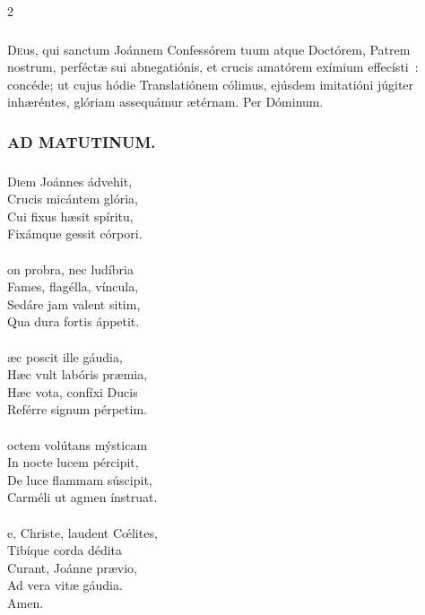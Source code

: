 \documentclass[9pt,twoside]{extarticle}
\begin{document}
\begin{multicols}{2}
\subsubsection*{\center {}}
\lettrine{D}eus, qui sanctum Joánnem Confessórem tuum atque Doctórem, Patrem nostrum, perféctæ sui abnegatiónis, et crucis amatórem exímium effecísti~: concéde; ut cujus hódie Translatiónem cólimus, ejúsdem imitatióni júgiter inhæréntes, glóriam assequámur ætérnam. Per Dóminum.

\subsubsection*{\center \textsc{AD MATUTINUM.}}
\subsubsection*{\center {}}
\lettrine{D}iem Joánnes ádvehit,\\
Crucis micántem glória,\\
Cui fixus hæsit spíritu,\\
Fixámque gessit córpori.\\
\\
on probra, nec ludíbria\\
Fames, flagélla, víncula,\\
Sedáre jam valent sitim,\\
Qua dura fortis áppetit.\\
\\
æc poscit ille gáudia,\\
Hæc vult labóris præmia,\\
Hæc vota, confíxi Ducis\\
Reférre signum pérpetim.\\
\\
octem volútans mýsticam\\
In nocte lucem pércipit,\\
De luce flammam súscipit,\\
Carméli ut agmen ínstruat.\\
\\
e, Christe, laudent Cœ́lites,\\
Tibíque corda dédita\\
Curant, Joánne prævio,\\
Ad vera vitæ gáudia.\\
Amen.

\begin{tightlist}{}
\item {}
\end{tightlist}


\end{multicols}
\end{document}
